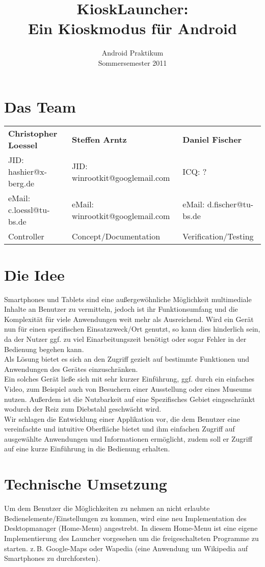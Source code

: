 \documentclass[12pt,a4paper,ngerman]{scrartcl}
\title{KioskLauncher: \\ Ein Kioskmodus für Android}
\subtitle{Android Praktikum \\ Sommersemester 2011}
\begin{document}
\maketitle
\section*{Das Team}
\begin{tabular}{ l l l }
  \textbf{Christopher Loessel} & \textbf{Steffen Arntz} & \textbf{Daniel Fischer} \smallskip \\ 
  JID: hashier@x-berg.de & JID: winrootkit@googlemail.com & ICQ: ? \\
  eMail: c.loessl@tu-bs.de & eMail: winrootkit@googlemail.com & eMail: d.fischer@tu-bs.de  \\
  Controller & Concept/Documentation & Verification/Testing \\
\end{tabular}

\section*{Die Idee}
Smartphones und Tablets sind eine außergewöhnliche Möglichkeit multimediale Inhalte an Benutzer zu vermitteln, jedoch ist ihr Funktionsumfang und die Komplexität für viele Anwendungen weit mehr als Ausreichend. 
Wird ein Gerät nun für einen spezifischen Einsatzzweck/Ort genutzt, so kann dies hinderlich sein, da der Nutzer ggf. zu viel Einarbeitungszeit benötigt oder sogar Fehler in der Bedienung begehen kann. \\
Als Lösung bietet es sich an den Zugriff gezielt auf bestimmte Funktionen und Anwendungen des Gerätes einzuschränken. \\
Ein solches Gerät ließe sich mit sehr kurzer Einführung, ggf. durch ein einfaches Video, zum Beispiel auch von Besuchern einer Ausstellung oder eines Museums nutzen. Außerdem ist die Nutzbarkeit auf eine Spezifisches Gebiet eingeschränkt wodurch der Reiz zum Diebstahl geschwächt wird. \\
Wir schlagen die Entwicklung einer Applikation vor, die dem Benutzer eine vereinfachte und intuitive Oberfläche bietet und ihm einfachen Zugriff auf ausgewählte Anwendungen und Informationen ermöglicht, zudem soll er Zugriff auf eine kurze Einführung in die Bedienung erhalten.

\section*{Technische Umsetzung}
Um dem Benutzer die Möglichkeiten zu nehmen an nicht erlaubte Bedienelemente/Einstellungen zu kommen, wird eine neu Implementation des Desktopmanager (Home-Menu) angestrebt. In diesem Home-Menu ist eine eigene Implementierung des Launcher vorgesehen um die freigeschalteten Programme zu starten. z.\,B. Google-Maps oder Wapedia (eine Anwendung um Wikipedia auf Smartphones zu durchforsten).
\end{document}

